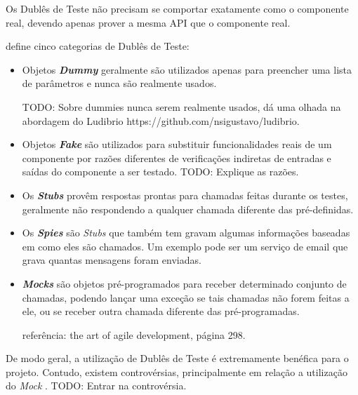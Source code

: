 Os Dublês de Teste não precisam se comportar exatamente como o componente real, devendo apenas prover a mesma API que o componente real.

 define cinco categorias de Dublês de Teste:

\begin{itemize}
\item
Objetos \textbf{\textit{Dummy}} geralmente são utilizados apenas para preencher uma lista de parâmetros e nunca são realmente usados.

TODO: Sobre dummies nunca serem realmente usados, dá uma olhada na abordagem do Ludibrio https://github.com/nsigustavo/ludibrio.

\item
Objetos \textbf{\textit{Fake}} são utilizados para substituir funcionalidades reais de um componente por razões diferentes de verificações indiretas de entradas e saídas do componente a ser testado. TODO: Explique as razões.

\item
Os \textbf{\textit{Stubs}} provêm respostas prontas para chamadas feitas durante os testes, geralmente não respondendo a qualquer   chamada diferente
das pré-definidas.

\item
Os \textbf{\textit{Spies}} são \textit{Stubs} que também tem gravam algumas informações baseadas em como eles são chamados. Um exemplo   pode ser um serviço de email que grava quantas mensagens foram   enviadas.

\item
\textbf{\textit{Mocks}} são objetos pré-programados para receber determinado conjunto de chamadas, podendo lançar uma exceção se tais chamadas não forem feitas a ele, ou se receber outra chamada diferente das pré-programadas.

referência: the art of agile development, página 298.
\end{itemize}

De modo geral, a utilização de Dublês de Teste é extremamente benéfica para o projeto. Contudo, existem controvérsias, principalmente em relação a utilização do \textit{Mock} \cite{MocksArentStubs}. TODO: Entrar na controvérsia.
